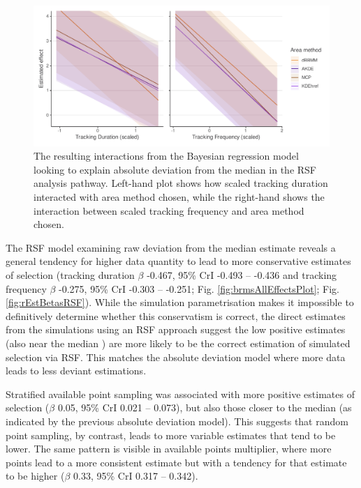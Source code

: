 \documentclass[10pt,a4paper]{article}
\begin{document}
\begin{figure}
\includegraphics[width=1\linewidth]{../figures/rsfEffectPlot_iteractions} \caption{The resulting interactions from the Bayesian regression model looking to explain absolute deviation from the median in the RSF analysis pathway. Left-hand plot shows how scaled tracking duration interacted with area method chosen, while the right-hand shows the interaction between scaled tracking frequency and area method chosen.}\label{fig:rsfInteractions}
\end{figure}

The RSF model examining raw deviation from the median estimate reveals a general tendency for higher data quantity to lead to more conservative estimates of selection (tracking duration \(\beta\) -0.467, 95\% CrI -0.493 -- -0.436 and tracking frequency \(\beta\) -0.275, 95\% CrI -0.303 -- -0.251; Fig. \ref{fig:brmsAllEffectsPlot}; Fig. \ref{fig:rEstBetasRSF}).
While the simulation parametrisation makes it impossible to definitively determine whether this conservatism is correct, the direct estimates from the simulations using an RSF approach suggest the low positive estimates (also near the median ) are more likely to be the correct estimation of simulated selection via RSF.
This matches the absolute deviation model where more data leads to less deviant estimations.

Stratified available point sampling was associated with more positive estimates of selection (\(\beta\) 0.05, 95\% CrI 0.021 -- 0.073), but also those closer to the median (as indicated by the previous absolute deviation model).
This suggests that random point sampling, by contrast, leads to more variable estimates that tend to be lower.
The same pattern is visible in available points multiplier, where more points lead to a more consistent estimate but with a tendency for that estimate to be higher (\(\beta\) 0.33, 95\% CrI 0.317 -- 0.342).
\end{document}
